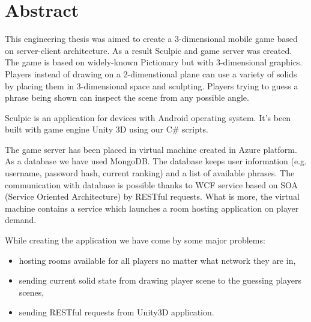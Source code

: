\chapter*{Abstract}

This engineering thesis was aimed to create a 3-dimensional mobile game based on server-client architecture. As a result Sculpic and game server was created. The game is based on widely-known Pictionary but with 3-dimensional graphics. Players instead of drawing on a 2-dimenstional plane can use a variety of solids by placing them in 3-dimensional space and sculpting. Players trying to guess a phrase being shown can inspect the scene from any possible angle.


Sculpic is an application for devices with Android operating system. It’s been built with game engine Unity 3D using our C\# scripts.


The game server has been placed in virtual machine created in Azure platform. As a database we have used MongoDB. The database keeps user information (e.g. username, password hash, current ranking) and a list of available phrases. The communication with database is possible thanks to WCF service based on SOA (Service Oriented Architecture) by RESTful requests. What is more, the virtual machine contains a service which launches a room hosting application on player demand.


While creating the application we have come by some major problems:
\begin{itemize}
\item hosting rooms available for all players no matter what network they are in,
\item sending current solid state from drawing player scene to the guessing players scenes,
\item sending RESTful requests from Unity3D application.
\end{itemize}
